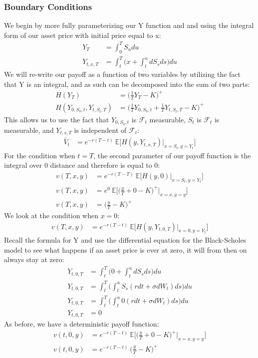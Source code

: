 \documentclass[a4paper,12pt]{article}
\begin{document}
\subsubsection{Boundary Conditions}
We begin by more fully parameterizing our Y function and and using the integral form of our asset price with initial price equal to x:
\begin{align*}
Y_{T} &= \int_0^T S_udu \\
Y_{t, x, T} &= \int_t^T \bigg(x +  \int_t^u dS_s ds \bigg) du
\end{align*}
We will re-write our payoff as a function of two variables by utilizing the fact that Y is an integral, and as such can be decomposed into the sum of two parts:
\begin{align*}
H(Y_T) &= \bigg( \frac{1}{T}Y_T - K \bigg)^+ \\
H(Y_{0, S_0, t}, Y_{t, S_t, T}) &= \bigg( \frac{1}{T}Y_{0,S_0,t} +  \frac{1}{T}Y_{t, S_t, T} - K \bigg)^+
\end{align*}
This allows us to use the fact that $Y_{0, S_0, t}$ is $\mathcal{F}_t$ measurable, $S_t$ is $\mathcal{F}_t$ is measurable, and $Y_{t, s, T}$ is independent of $\mathcal{F}_t$:
\begin{align*}
\tilde{V_t} &= e^{-r(T-t)} \ \mathbb{E} \big[ H (y, Y_{t, x, T}) | _{x = S_t, y = Y_t} \big]
\end{align*}
%
For the condition when $t = T$, the second parameter of our payoff function is the integral over 0 distance and therefore is equal to 0:
\begin{align*}
v(T, x, y) &= e^{-r(T-T)} \ \mathbb{E} \big[ H (y, 0) | _{x = S_t, y = Y_t} \big] \\
v(T, x, y) &= e^{0} \ \mathbb{E} \big[ \bigg( \frac{y}{T} +  0  - K \bigg)^+ | _{x = x, y = y} \big] \\
v(T, x, y) &=  \bigg( \frac{y}{T} - K \bigg)^+
\end{align*}
%
We look at the condition when $x = 0$:
\begin{align*}
v(T, x, y) &= e^{-r(T-t)} \ \mathbb{E} \big[ H (y, Y_{t, 0, T}) | _{x = 0, y = Y_t} \big]
\end{align*}
Recall the formula for Y and use the differential equation for the Black-Scholes model to see what happens if an asset price is ever at zero, it will from then on always stay at zero:
\begin{align*}
Y_{t, 0, T} &= \int_t^T \bigg( 0 + \int_t^u dS_s ds \bigg) du \\
Y_{t, 0, T} &= \int_t^T \bigg( \int_t^u S_s(rdt + \sigma dW_t) ds \bigg) du \\
Y_{t, 0, T} &= \int_t^T \bigg( \int_t^u 0(rdt + \sigma dW_t) ds \bigg) du \\
Y_{t, 0, T} &= 0
\end{align*}
%
As before, we have a deterministic payoff function:
\begin{align*}
v(t, 0, y) &=  e^{-r(T-t)} \ \mathbb{E} \big[ \bigg( \frac{y}{T} +  0  - K \bigg)^+ | _{x = x, y = y} \big] \\
v(t, 0, y) &=  e^{-r(T-t)} \ \bigg( \frac{y}{T} - K \bigg)^+
\end{align*}
\end{document}
